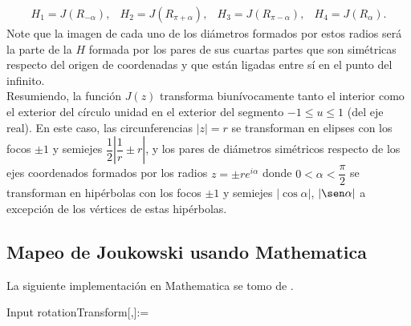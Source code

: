\[
	\begin{array}{cccc}
		H_1=J(R_{-\alpha}),&H_2=J(R_{\pi + \alpha}),&H_3=J(R_{\pi -\alpha}), &H_4=J(R_{\alpha}).
	\end{array}
\]
Note que la imagen de cada uno de los diámetros formados por estos radios será la parte de la $H$ formada por los pares de sus cuartas partes que son simétricas respecto del origen de coordenadas y que están ligadas entre sí en el punto del infinito.\\
Resumiendo, la función $J(z)$ transforma biunívocamente tanto el interior como el exterior del círculo unidad en el exterior del segmento $-1\leq u \leq 1$ (del eje real).  En este caso, las circunferencias $|z|=r$ se transforman en elipses con los focos $\pm1$ y semiejes $\dfrac{1}{2}\left|\dfrac{1}{r}\pm r \right|$, y los pares de diámetros simétricos respecto de los ejes coordenados formados por los radios $z=\pm re^{i\alpha}$ donde $0<\alpha<\dfrac{\pi}{2}$ se transforman en hipérbolas con los focos $\pm 1$ y semiejes $|\cos\alpha|$, $|\sen\alpha|$ a excepción de los vértices de estas hipérbolas. 

\subsection{Mapeo de Joukowski usando Mathematica} \label{Joukowski-mathematica}
La siguiente implementación en Mathematica se tomo de \cite{GeometryJo}.

\begin{mmaCell}{Input}
	 rotationTransform[\mmaPat{\(\pmb{\zeta}\)_},\mmaPat{\(\pmb{\alpha}\)_}]:=\mmaPat{\(\pmb{\zeta}\)} 
\end{mmaCell}

